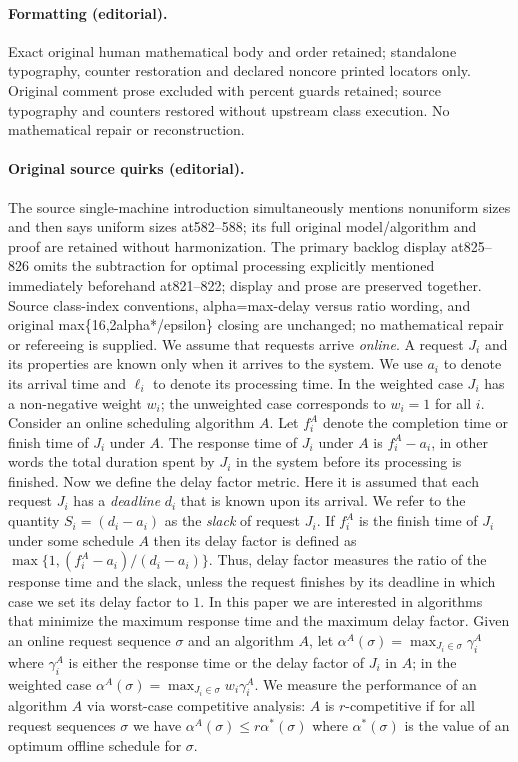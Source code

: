 \documentclass[10pt]{article}
\theoremstyle{definition}
\numberwithin{equation}{section}
\begin{document}
\paragraph{Formatting (editorial).} Exact original human mathematical body and order retained; standalone typography, counter restoration and declared noncore printed locators only. Original comment prose excluded with percent guards retained; source typography and counters restored without upstream class execution. No mathematical repair or reconstruction.
\paragraph{Original source quirks (editorial).} The source single-machine introduction simultaneously mentions nonuniform sizes and then says uniform sizes at582–588; its full original model/algorithm and proof are retained without harmonization. The primary backlog display at825–826 omits the subtraction for optimal processing explicitly mentioned immediately beforehand at821–822; display and prose are preserved together. Source class-index conventions, alpha=max-delay versus ratio wording, and original max\{16,2alpha*/epsilon\} closing are unchanged; no mathematical repair or refereeing is supplied.
\endgroup
\clearpage
\setcounter{section}{1}
We assume that requests arrive \emph{online}. A request $J_i$ and its
properties are known only when it arrives to the system.  We use
$a_i$ to denote its arrival time and $\ell_i$ to denote its
processing time. In the weighted case $J_i$ has a non-negative
weight $w_i$; the unweighted case corresponds to $w_i=1$ for all
$i$. Consider an online scheduling algorithm $A$. Let $f^A_i$ denote
the completion time or finish time of $J_i$ under $A$.  The response
time of $J_i$ under $A$ is $f^A_i - a_i$, in other words the total
duration spent by $J_i$ in the system before its processing is
finished. Now we define the delay factor metric. Here it is
assumed that each request $J_i$ has a \emph{deadline} $d_i$ that is
known upon its arrival. We refer to the quantity $S_i = (d_i-a_i)$
as the \emph{slack} of request $J_i$. If $f^A_i$ is the finish time
of $J_i$ under some schedule $A$ then its delay factor is defined as
$\max \{ 1, {(f^A_i - a_i)}/{(d_i - a_i)}\}$. Thus, delay factor
measures the ratio of the response time and the slack, unless the
request finishes by its deadline in which case we set its delay
factor to $1$.  In this paper we are interested in algorithms that
minimize the maximum response time and the maximum delay factor.
Given an online request sequence $\sigma$ and an algorithm $A$, let
$\alpha^A(\sigma) = \max_{J_i \in \sigma} \gamma^A_i$ where
$\gamma^A_i$ is either the response time or the delay factor of
$J_i$ in $A$; in the weighted case $\alpha^A(\sigma) = \max_{J_i \in
\sigma} w_i \gamma^A_i$.  We measure the performance of an algorithm
$A$ via worst-case competitive analysis: $A$ is $r$-competitive if
for all request sequences $\sigma$ we have $\alpha^A(\sigma) \le r
\alpha^*(\sigma)$ where $\alpha^*(\sigma)$ is the value of an
optimum offline schedule for $\sigma$.
\end{document}
